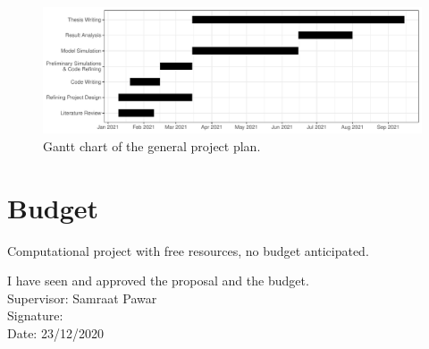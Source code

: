 \documentclass[11pt, a4paper]{article}
\begin{document}
\begin{spacing}{1.5}
\begin{figure}[H]
    \centering
    \includegraphics[scale = 0.74]{Gantt_chart.pdf}
    \caption{Gantt chart of the general project plan.}
    \label{fig:Gantt_chart}
\end{figure}

\section{Budget}

Computational project with free resources, no budget anticipated. 




\pagebreak

I have seen and approved the proposal and the budget. \\

Supervisor: Samraat Pawar\\

Signature: \\

Date: 23/12/2020
\end{spacing}
\end{document}
